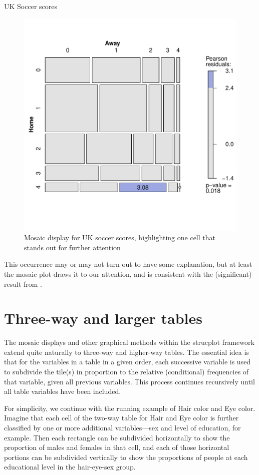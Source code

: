 \documentclass[10pt,krantz2]{krantz}\usepackage[]{graphicx}\usepackage[]{color}
\newenvironment{knitrout}{}{} %
\renewenvironment{knitrout}{\small\renewcommand{\baselinestretch}{.85}}{} %
\begin{document}
\begin{Example}[soccer2]{UK Soccer scores}
\begin{knitrout}
\begin{figure}[!htbp]
\centerline{\includegraphics[width=.6\textwidth]{ch05/fig/UKsoccer-mosaic-1} }

\caption[Mosaic display for UK soccer scores, highlighting one cell that stands out for further attention]{Mosaic display for UK soccer scores, highlighting one cell that stands out for further attention}\label{fig:UKsoccer-mosaic}
\end{figure}


\end{knitrout}
This occurrence may or may not turn out to have some explanation, but at least
the mosaic plot draws it to our attention, and is consistent with the
(significant) result from .
\end{Example}



\section{Three-way and larger tables}\label{sec:mosaic-threeway}


The mosaic displays and other graphical methods within the strucplot framework
extend quite naturally to three-way and higher-way tables.
The essential idea is that for the variables in a \mway table in a given order,
each successive variable is used to subdivide the tile(s) in proportion to
the relative (conditional) frequencies of that variable, given all previous
variables.  This process continues recursively until all table variables
have been included.

For simplicity, we continue with the running example of Hair color and Eye color.
Imagine that each
cell of the two-way table for Hair and Eye color is further
classified by one or more additional variables---sex and level of
education, for example.  Then each rectangle can be subdivided
horizontally to show the proportion of males and females in that
cell, and each of those horizontal portions can be subdivided
vertically to show the proportions of people at each educational
level in the hair-eye-sex group.
\end{document}

